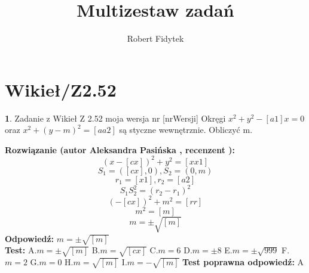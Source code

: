 \documentclass[12pt, a4paper]{article}
\title{Multizestaw zadań}
\author{Robert Fidytek}
\date{}
\theoremstyle{definition} %
\newtheorem{zad}{}
\newcommand{\kategoria}[1]{\section{#1}} %
\newcommand{\zadStart}[1]{\begin{zad}#1\newline} %
\newcommand{\zadStop}{\end{zad}}   %
\newcommand{\rozwStart}[2]{\noindent \textbf{Rozwiązanie (autor #1 , recenzent #2): }\newline} %
\newcommand{\rozwStop}{\newline}                                            %
\newcommand{\odpStart}{\noindent \textbf{Odpowiedź:}\newline}    %
\newcommand{\odpStop}{\newline}                                             %
\newcommand{\testStart}{\noindent \textbf{Test:}\newline} %
\newcommand{\testStop}{\newline} %
\newcommand{\kluczStart}{\noindent \textbf{Test poprawna odpowiedź:}\newline} %
\newcommand{\kluczStop}{\newline} %
\begin{document}
\maketitle


\kategoria{Wikieł/Z2.52}
\zadStart{Zadanie z Wikieł Z 2.52 moja wersja nr [nrWersji]}
Okręgi $x^2+y^2-[a1]x=0$ oraz $x^2+(y-m)^2=[aa2]$ są styczne wewnętrznie. Obliczyć m.
\zadStop
\rozwStart{Aleksandra Pasińska}{}
$$(x-[cx])^2+y^2=[xx1]$$
$$S_1=([cx],0), S_2=(0,m)$$
$$r_1=[x1], r_2=[a2]$$
$$S_1S_2^2=(r_2-r_1)^2$$
$$(-[cx])^2+m^2=[rr]$$
$$m^2=[m]$$
$$m=\pm \sqrt{[m]}$$
\rozwStop
\odpStart
$m=\pm \sqrt{[m]}$\\
\odpStop
\testStart
A.$m=\pm \sqrt{[m]}$
B.$m=\sqrt{[cx]}$
C.$m=6$
D.$m=\pm 8$
E.$m=\pm \sqrt{999}$
F.$m= 2$
G.$m=0$
H.$m=\sqrt{[m]}$
I.$m=- \sqrt{[m]}$
\testStop
\kluczStart
A
\kluczStop
\end{document}
